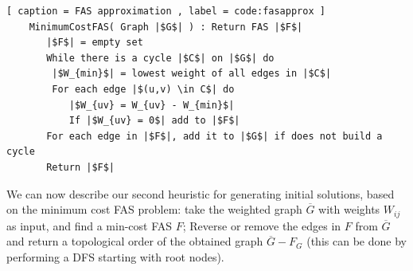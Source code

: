 \begin{lstlisting}[ caption = FAS approximation , label = code:fasapprox ]
	MinimumCostFAS( Graph |$G$| ) : Return FAS |$F$|
	   |$F$| = empty set
	   While there is a cycle |$C$| on |$G$| do
	   	|$W_{min}$| = lowest weight of all edges in |$C$|
		For each edge |$(u,v) \in C$| do
		   |$W_{uv} = W_{uv} - W_{min}$|
		   If |$W_{uv} = 0$| add to |$F$|
	   For each edge in |$F$|, add it to |$G$| if does not build a cycle
	   Return |$F$|
\end{lstlisting}

We can now describe our second heuristic for generating initial solutions, based on the minimum cost FAS problem: take the weighted graph $\overline G$ with weights $W_{ij}$ as input, and find a min-cost FAS $F$; Reverse or remove the edges in $F$ from $\overline G$ and return a topological order of the obtained graph $\overline G - F_G$ (this can be done by performing a DFS starting with root nodes).

